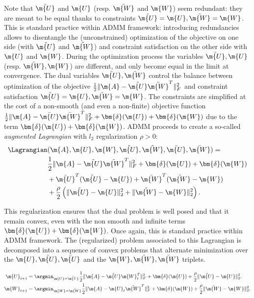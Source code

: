 Note that $\tilde{\m{U}}$ and $\m{U}$ (resp. $\tilde{\m{W}}$ and $\m{W}$) seem redundant: they are meant to be equal thanks to constraints $\tilde{\m{U}}=\m{U}, \tilde{\m{W}}=\m{W}$. This is standard practice within ADMM framework: introducing redundancies allows to disentangle the (unconstrained) optimization of the objective on one side (with $\tilde{\m{U}}$ and $\tilde{\m{W}}$) and constraint satisfaction on the other side with $\m{U}$ and $\m{W}$. During the optimization process the variables $\tilde{\m{U}},\m{U}$ (resp. $\tilde{\m{W}},\m{W}$) are different, and only become equal in the limit at convergence. The dual variables $\bar{\m{U}},\bar{\m{W}}$ control the balance between optimization of the objective $\frac{1}{2}\|\m{A}-\tilde{\m{U}} \tilde{\m{W}}^T\|^2_F$ and constraint satisfaction $\tilde{\m{U}}=\m{U}, \tilde{\m{W}}=\m{W}$. The constraints are simplified at the cost of a non-smooth (and even a non-finite) objective function $\frac{1}{2}\|\m{A} -\bar{\m{U}} \bar{\m{W}}^T\|^2_F+\bm{\delta}(\m{U})+\bm{\delta}(\m{W})$ due to the term $\bm{\delta}(\m{U})+\bm{\delta}(\m{W})$. ADMM proceeds to create a so-called \textit{augmented Lagrangian} with $l_2$ regularization $\rho>0$:
\begin{equation}
    \begin{aligned}
    \Lagrangian&(\m{A},\m{U},\m{W},\tilde{\m{U}},\tilde{\m{W}},\bar{\m{U}},\bar{\m{W}})=\\
    &\frac{1}{2}\|\m{A}-\tilde{\m{U}}\tilde{\m{W}}^T\|^2_F+\bm{\delta}(\m{U})+\bm{\delta}(\m{W})\\
    &+\bar{\m{U}}^T(\tilde{\m{U}}-\m{U})+\bar{\m{W}}^T(\tilde{\m{W}}-\m{W})\\
    &+\frac{\rho}{2}\left(\|\tilde{\m{U}}-\m{U}\|_2^2+\|\tilde{\m{W}}-\m{W}\|_2^2\right).
    \end{aligned}
\end{equation}

This regularization ensures that the dual problem is well posed and that it remain convex, even with the non smooth and infinite terms $\bm{\delta}(\m{U})+\bm{\delta}(\m{W})$. Once again, this is standard practice within ADMM framework. The (regularized) problem associated to this Lagrangian is decomposed into a sequence of convex problems that alternate minimization over the $\m{U},\tilde{\m{U}},\bar{\m{U}}$ and the $\m{W},\tilde{\m{W}},\bar{\m{W}}$ triplets.
  
\begin{align}\label{apeq:craft:pairnnls}
\m{U}_{t+1}&=\argmin_{\m{U}=\tilde{\m{U}}} \frac{1}{2}\|\m{A}-\tilde{\m{U}}\m{W}_t^T\|^2_F+\bm{\delta}(\m{U})+\frac{\rho}{2}\|\tilde{\m{U}}-\m{U}\|_2^2. %
\\
\m{W}_{t+1}&=\argmin_{\m{W}=\tilde{\m{W}}} \frac{1}{2}\|\m{A}-\m{U}_t\tilde{\m{W}}^T\|^2_F+\bm{\delta}(\m{W})+\frac{\rho}{2}\|\tilde{\m{W}}-\m{W}\|_2^2.%
\end{align}

